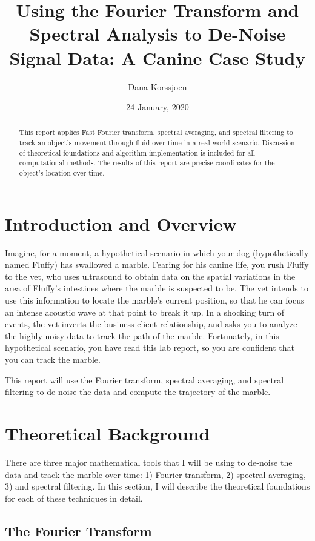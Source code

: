 \documentclass[a4paper,12 pt]{article}
\title{Using the Fourier Transform and Spectral Analysis to De-Noise Signal Data: A Canine Case Study}
\author{Dana Korssjoen}
\date{24 January, 2020}
\begin{document}
\maketitle
\begin{abstract}
    This report applies Fast Fourier transform, spectral averaging, and spectral filtering to track an object's movement through fluid over time in a real world scenario. Discussion of theoretical foundations and algorithm implementation is included for all computational methods. The results of this report are precise coordinates for the object's location over time.
\end{abstract}
\section{Introduction and Overview}

Imagine, for a moment, a hypothetical scenario in which your dog (hypothetically named Fluffy) has swallowed a marble. Fearing for his canine life, you rush Fluffy to the vet, who uses ultrasound to obtain data on the spatial variations in the area of Fluffy's intestines where the marble is suspected to be. The vet intends to use this information to locate the marble's current position, so that he can focus an intense acoustic wave at that point to break it up. In a shocking turn of events, the vet inverts the business-client relationship, and asks you to analyze the highly noisy data to track the path of the marble. Fortunately, in this hypothetical scenario, you have read this lab report, so you are confident that you can track the marble.

This report will use the Fourier transform, spectral averaging, and spectral filtering to de-noise the data and compute the trajectory of the marble.

\section{Theoretical Background}
There are three major mathematical tools that I will be using to de-noise the data and track the marble over time: 1) Fourier transform, 2) spectral averaging, 3) and spectral filtering. In this section, I will describe the theoretical foundations for each of these techniques in detail.

\subsection{The Fourier Transform}
\end{document}
